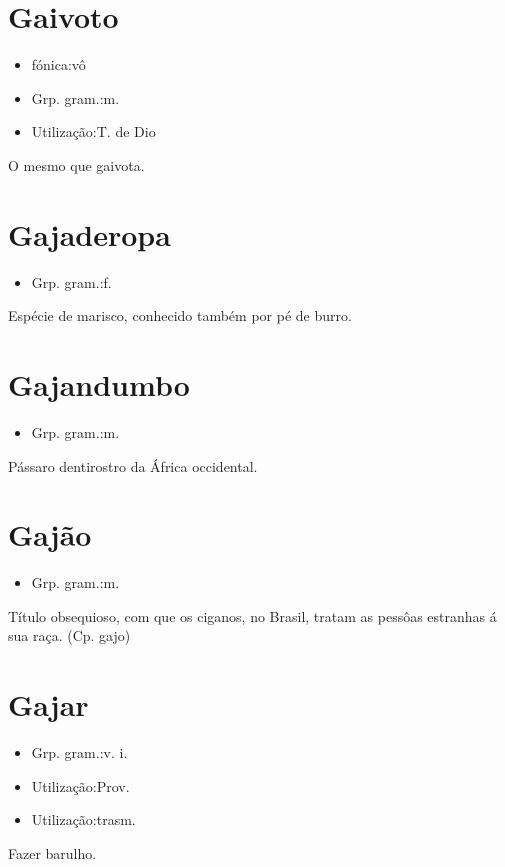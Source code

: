 \section{Gaivoto}
\begin{itemize}
\item {fónica:vô}
\end{itemize}
\begin{itemize}
\item {Grp. gram.:m.}
\end{itemize}
\begin{itemize}
\item {Utilização:T. de Dio}
\end{itemize}
O mesmo que \textunderscore gaivota\textunderscore .
\section{Gajaderopa}
\begin{itemize}
\item {Grp. gram.:f.}
\end{itemize}
Espécie de marisco, conhecido também por \textunderscore pé de burro\textunderscore .
\section{Gajandumbo}
\begin{itemize}
\item {Grp. gram.:m.}
\end{itemize}
Pássaro dentirostro da África occidental.
\section{Gajão}
\begin{itemize}
\item {Grp. gram.:m.}
\end{itemize}
Título obsequioso, com que os ciganos, no Brasil, tratam as pessôas estranhas á sua raça.
(Cp. \textunderscore gajo\textunderscore )
\section{Gajar}
\begin{itemize}
\item {Grp. gram.:v. i.}
\end{itemize}
\begin{itemize}
\item {Utilização:Prov.}
\end{itemize}
\begin{itemize}
\item {Utilização:trasm.}
\end{itemize}
Fazer barulho.
